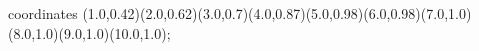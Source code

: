 					coordinates { (1.0,0.42)(2.0,0.62)(3.0,0.7)(4.0,0.87)(5.0,0.98)(6.0,0.98)(7.0,1.0)(8.0,1.0)(9.0,1.0)(10.0,1.0)};